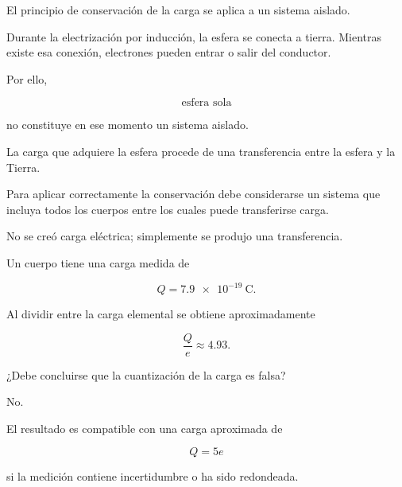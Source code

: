\begin{explicacion}

El principio de conservación de la carga se aplica a un sistema aislado.

Durante la electrización por inducción, la esfera se conecta a tierra.
Mientras existe esa conexión, electrones pueden entrar o salir del conductor.

Por ello,

\[
\text{esfera sola}
\]

no constituye en ese momento un sistema aislado.

La carga que adquiere la esfera procede de una transferencia entre la esfera
y la Tierra.

Para aplicar correctamente la conservación debe considerarse un sistema que
incluya todos los cuerpos entre los cuales puede transferirse carga.

No se creó carga eléctrica; simplemente se produjo una transferencia.

\end{explicacion}



\begin{ejercicio}

Un cuerpo tiene una carga medida de

\[
Q=\SI{7.9e-19}{\coulomb}.
\]

Al dividir entre la carga elemental se obtiene aproximadamente

\[
\frac{Q}{e}\approx4.93.
\]

¿Debe concluirse que la cuantización de la carga es falsa?

\end{ejercicio}

\begin{respuesta}

No.

El resultado es compatible con una carga aproximada de

\[
\boxed{
Q=5e
}
\]

si la medición contiene incertidumbre o ha sido redondeada.

\end{respuesta}

